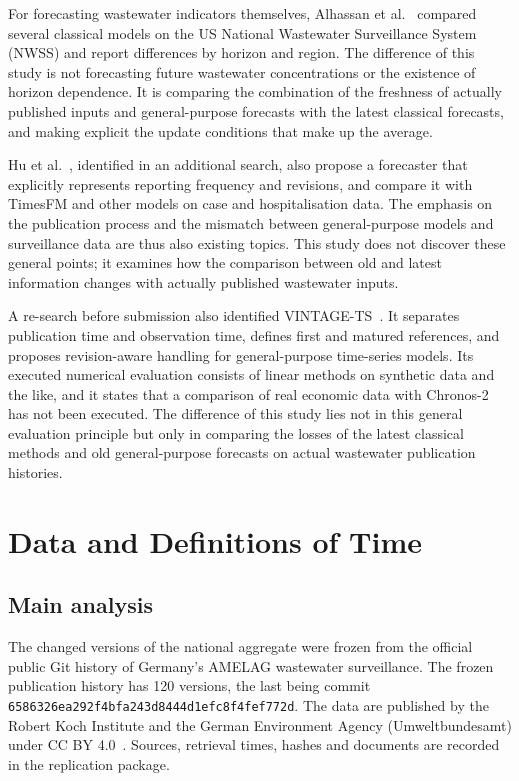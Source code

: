 \documentclass[11pt]{article}
\begin{document}
For forecasting wastewater indicators themselves, Alhassan et al.~\cite{alhassan2025} compared several classical models on the US National Wastewater Surveillance System (NWSS) and report differences by horizon and region. The difference of this study is not forecasting future wastewater concentrations or the existence of horizon dependence. It is comparing the combination of the freshness of actually published inputs and general-purpose forecasts with the latest classical forecasts, and making explicit the update conditions that make up the average.

Hu et al.~\cite{hu2026}, identified in an additional search, also propose a forecaster that explicitly represents reporting frequency and revisions, and compare it with TimesFM and other models on case and hospitalisation data. The emphasis on the publication process and the mismatch between general-purpose models and surveillance data are thus also existing topics. This study does not discover these general points; it examines how the comparison between old and latest information changes with actually published wastewater inputs.

A re-search before submission also identified VINTAGE-TS~\cite{ahmad2026}. It separates publication time and observation time, defines first and matured references, and proposes revision-aware handling for general-purpose time-series models. Its executed numerical evaluation consists of linear methods on synthetic data and the like, and it states that a comparison of real economic data with Chronos-2 has not been executed. The difference of this study lies not in this general evaluation principle but only in comparing the losses of the latest classical methods and old general-purpose forecasts on actual wastewater publication histories.

\section{Data and Definitions of Time}\label{sec:data}

\subsection{Main analysis}

The changed versions of the national aggregate were frozen from the official public Git history of Germany's AMELAG wastewater surveillance. The frozen publication history has 120 versions, the last being commit \texttt{6586326ea292f4bfa243d8444d1efc8f4fef772d}. The data are published by the Robert Koch Institute and the German Environment Agency (Umweltbundesamt) under CC BY 4.0~\cite{amelagdata}. Sources, retrieval times, hashes and documents are recorded in the replication package.
\end{document}
